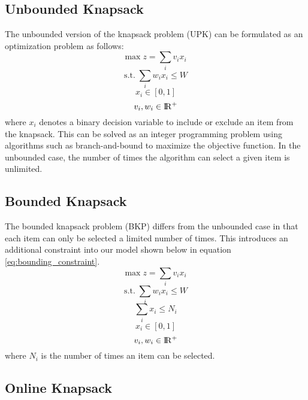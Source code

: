 \documentclass[12pt]{article}
\begin{document}
\subsection{Unbounded Knapsack}

The unbounded version of the knapsack problem (UPK) can be formulated as an optimization problem as follows:
%
\begin{equation}
\textrm{max} \; z = \sum_i v_i x_i
\end{equation}
%
\begin{equation}
\textrm{s.t.} \; \sum_i w_i x_i \leq W
\end{equation}
%
\begin{equation}
x_i \in [0, 1]
\end{equation}
%
\begin{equation}
v_i, w_i \in \rm I\!R^+
\end{equation}
%
where $x_i$ denotes a binary decision variable to include or exclude an item from the knapsack. 
This can be solved as an integer programming problem using algorithms such as branch-and-bound to maximize the objective function. 
In the unbounded case, the number of times the algorithm can select a given item is unlimited.

\subsection{Bounded Knapsack}

The bounded knapsack problem (BKP) differs from the unbounded case in that each item can only be selected a limited number of times. 
This introduces an additional constraint into our model shown below in equation \ref{eq:bounding_constraint}.
%
\begin{equation}
\textrm{max} \; z = \sum_i v_i x_i
\end{equation}
%
\begin{equation}
\textrm{s.t.} \; \sum_i w_i x_i \leq W
\end{equation}
%
\begin{equation}
\sum_i x_i \leq N_i
\label{eq:bounding_constraint}
\end{equation}
%
\begin{equation}
x_i \in [0, 1]
\end{equation}
%
\begin{equation}
v_i, w_i \in \rm I\!R^+
\end{equation}
%
where $N_i$ is the number of times an item can be selected.

\subsection{Online Knapsack}
\end{document}
